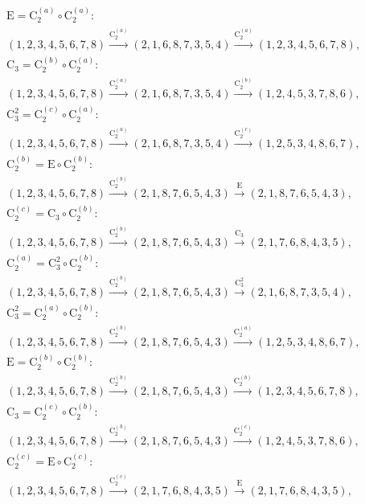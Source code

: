 \begin{align*}
& \mathrm{E} = \mathrm{C}_{2}^{(a)} \circ \mathrm{C}_{2}^{(a)}:\; \\& (1,2,3,4,5,6,7,8) \xrightarrow{\mathrm{C}_{2}^{(a)}} (2,1,6,8,7,3,5,4) \xrightarrow{\mathrm{C}_{2}^{(a)}} (1,2,3,4,5,6,7,8), \\
& \mathrm{C}_{3} = \mathrm{C}_{2}^{(b)} \circ \mathrm{C}_{2}^{(a)}:\; \\& (1,2,3,4,5,6,7,8) \xrightarrow{\mathrm{C}_{2}^{(a)}} (2,1,6,8,7,3,5,4) \xrightarrow{\mathrm{C}_{2}^{(b)}} (1,2,4,5,3,7,8,6), \\
& \mathrm{C}_{3}^{2} = \mathrm{C}_{2}^{(c)} \circ \mathrm{C}_{2}^{(a)}:\; \\& (1,2,3,4,5,6,7,8) \xrightarrow{\mathrm{C}_{2}^{(a)}} (2,1,6,8,7,3,5,4) \xrightarrow{\mathrm{C}_{2}^{(c)}} (1,2,5,3,4,8,6,7), \\
& \mathrm{C}_{2}^{(b)} = \mathrm{E} \circ \mathrm{C}_{2}^{(b)}:\; \\& (1,2,3,4,5,6,7,8) \xrightarrow{\mathrm{C}_{2}^{(b)}} (2,1,8,7,6,5,4,3) \xrightarrow{\mathrm{E}} (2,1,8,7,6,5,4,3), \\
& \mathrm{C}_{2}^{(c)} = \mathrm{C}_{3} \circ \mathrm{C}_{2}^{(b)}:\; \\& (1,2,3,4,5,6,7,8) \xrightarrow{\mathrm{C}_{2}^{(b)}} (2,1,8,7,6,5,4,3) \xrightarrow{\mathrm{C}_{3}} (2,1,7,6,8,4,3,5), \\
& \mathrm{C}_{2}^{(a)} = \mathrm{C}_{3}^{2} \circ \mathrm{C}_{2}^{(b)}:\; \\& (1,2,3,4,5,6,7,8) \xrightarrow{\mathrm{C}_{2}^{(b)}} (2,1,8,7,6,5,4,3) \xrightarrow{\mathrm{C}_{3}^{2}} (2,1,6,8,7,3,5,4), \\
& \mathrm{C}_{3}^{2} = \mathrm{C}_{2}^{(a)} \circ \mathrm{C}_{2}^{(b)}:\; \\& (1,2,3,4,5,6,7,8) \xrightarrow{\mathrm{C}_{2}^{(b)}} (2,1,8,7,6,5,4,3) \xrightarrow{\mathrm{C}_{2}^{(a)}} (1,2,5,3,4,8,6,7), \\
& \mathrm{E} = \mathrm{C}_{2}^{(b)} \circ \mathrm{C}_{2}^{(b)}:\; \\& (1,2,3,4,5,6,7,8) \xrightarrow{\mathrm{C}_{2}^{(b)}} (2,1,8,7,6,5,4,3) \xrightarrow{\mathrm{C}_{2}^{(b)}} (1,2,3,4,5,6,7,8), \\
& \mathrm{C}_{3} = \mathrm{C}_{2}^{(c)} \circ \mathrm{C}_{2}^{(b)}:\; \\& (1,2,3,4,5,6,7,8) \xrightarrow{\mathrm{C}_{2}^{(b)}} (2,1,8,7,6,5,4,3) \xrightarrow{\mathrm{C}_{2}^{(c)}} (1,2,4,5,3,7,8,6), \\
& \mathrm{C}_{2}^{(c)} = \mathrm{E} \circ \mathrm{C}_{2}^{(c)}:\; \\& (1,2,3,4,5,6,7,8) \xrightarrow{\mathrm{C}_{2}^{(c)}} (2,1,7,6,8,4,3,5) \xrightarrow{\mathrm{E}} (2,1,7,6,8,4,3,5), \\

\end{align*}
